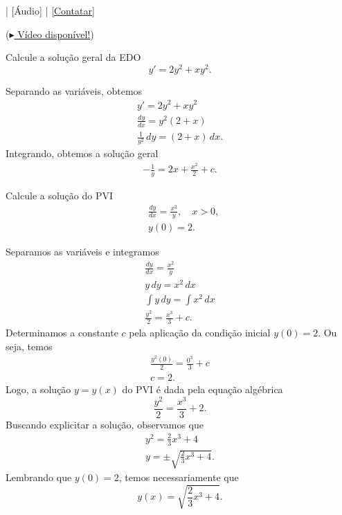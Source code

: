 \begin{flushright}
  [Vídeo] | [Áudio] | \href{https://phkonzen.github.io/notas/contato.html}{[Contatar]}
\end{flushright}

\begin{exeresol} (\href{https://archive.org/details/er-edo-eq-separavel}{$\blacktriangleright$ Vídeo disponível!})
  
  Calcule a solução geral da EDO
  \begin{equation}
    y' = 2y^2 + xy^2.
  \end{equation}
\end{exeresol}
\begin{resol}
  Separando as variáveis, obtemos
  \begin{gather}
    y' = 2y^2 + xy^2 \\
    \frac{dy}{dx} = y^2(2 + x) \\
    \frac{1}{y^2}\,dy = (2+x)\,dx.
  \end{gather}
  Integrando, obtemos a solução geral
  \begin{align}
    -\frac{1}{y} = 2x + \frac{x^2}{2} + c.
  \end{align}
\end{resol}

\begin{exeresol}
  Calcule a solução do PVI
  \begin{align}
    &\frac{dy}{dx} = \frac{x^2}{y},\quad x>0,\\
    &y(0) = 2.
  \end{align}
\end{exeresol}
\begin{resol}
  Separamos as variáveis e integramos
  \begin{gather}
    \frac{dy}{dx} = \frac{x^2}{y} \\
    y\,dy = x^2\,dx \\
    \int y\,dy = \int x^2\,dx \\
    \frac{y^2}{2} = \frac{x^3}{3} + c.
  \end{gather}
  Determinamos a constante $c$ pela aplicação da condição inicial $y(0) = 2$. Ou seja, temos
  \begin{gather}
    \frac{y^2(0)}{2} = \frac{0^3}{3} + c \\
    c = 2.
  \end{gather}
  Logo, a solução $y = y(x)$ do PVI é dada pela equação algébrica
  \begin{equation}
    \frac{y^2}{2} = \frac{x^3}{3} + 2.
  \end{equation}
  Buscando explicitar a solução, observamos que
  \begin{gather}
    y^2 = \frac{2}{3}x^3 + 4 \\
    y = \pm\sqrt{\frac{2}{3}x^3+4}.
  \end{gather}
  Lembrando que $y(0) = 2$, temos necessariamente que
  \begin{equation}
    y(x) = \sqrt{\frac{2}{3}x^3 + 4}.
  \end{equation}
\end{resol}

